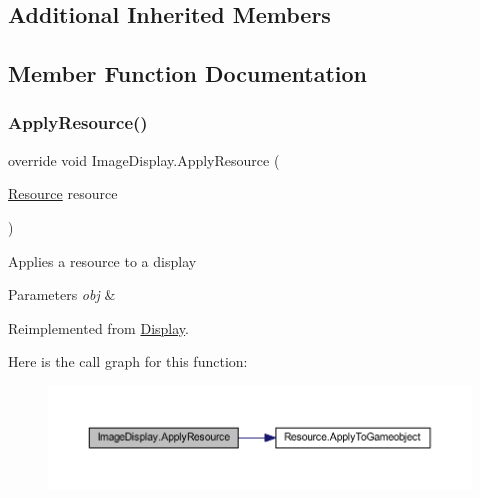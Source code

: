 \subsection*{Additional Inherited Members}


\subsection{Member Function Documentation}
\mbox{\label{class_image_display_a733a86ef960e7836442e858b5d52dbec}} 
\subsubsection{\texorpdfstring{Apply\+Resource()}{ApplyResource()}}
{\footnotesize\ttfamily override void Image\+Display.\+Apply\+Resource (\begin{DoxyParamCaption}\item[{\mbox{\hyperlink{class_resource}{Resource}}}]{resource }\end{DoxyParamCaption})\hspace{0.3cm}{\ttfamily [virtual]}}



Applies a resource to a display 


\begin{DoxyParams}{Parameters}
{\em obj} & \\
\hline
\end{DoxyParams}


Reimplemented from \mbox{\hyperlink{class_display_aa1d23e0e870c59c63e2f040e84ef0121}{Display}}.

Here is the call graph for this function\+:
\nopagebreak
\begin{figure}[H]
\begin{center}
\leavevmode
\includegraphics[width=350pt]{class_image_display_a733a86ef960e7836442e858b5d52dbec_cgraph}
\end{center}
\end{figure}
\mbox{\label{class_image_display_a3dfa32d33641e56a6623265150b8ddba}} 
